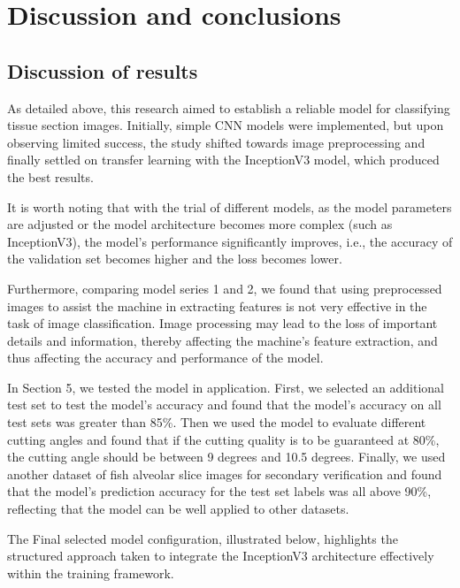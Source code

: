 \section{Discussion and conclusions}
\label{sec:results}

\subsection{Discussion of results}


As detailed above, this research aimed to establish a reliable model for classifying tissue section images. Initially, simple CNN models were implemented, but upon observing limited success, the study shifted towards image preprocessing and finally settled on transfer learning with the InceptionV3 model, which produced the best results.

It is worth noting that with the trial of different models, as the model parameters are adjusted or the model architecture becomes more complex (such as InceptionV3), the model's performance significantly improves, i.e., the accuracy of the validation set becomes higher and the loss becomes lower.

Furthermore, comparing model series 1 and 2, we found that using preprocessed images to assist the machine in extracting features is not very effective in the task of image classification. Image processing may lead to the loss of important details and information, thereby affecting the machine's feature extraction, and thus affecting the accuracy and performance of the model.

In Section 5, we tested the model in application. First, we selected an additional test set to test the model's accuracy and found that the model's accuracy on all test sets was greater than 85\%. Then we used the model to evaluate different cutting angles and found that if the cutting quality is to be guaranteed at 80\%, the cutting angle should be between 9 degrees and 10.5 degrees. Finally, we used another dataset of fish alveolar slice images for secondary verification and found that the model's prediction accuracy for the test set labels was all above 90\%, reflecting that the model can be well applied to other datasets.

The Final selected model configuration, illustrated below, highlights the structured approach taken to integrate the InceptionV3 architecture effectively within the training framework.

